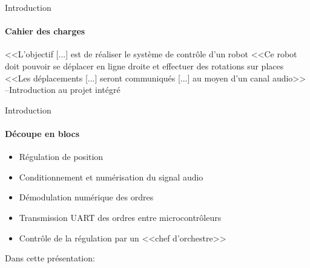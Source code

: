 \begin{frame}{Introduction}
\framesubtitle{Cahier des charges}
\large
<<L'objectif [...] est de réaliser le système de contrôle d'un robot
\vfill
<<Ce robot doit pouvoir se déplacer en ligne droite et effectuer des rotations sur places
\vfill
<<Les déplacements [...] seront communiqués [...] au moyen d'un canal audio>>
\vfill
\hspace{5em}--Introduction au projet intégré
\end{frame}


\begin{frame}{Introduction}
  \framesubtitle{Découpe en blocs}
  \begin{itemize}
    \item Régulation de position
    \item Conditionnement et numérisation du signal audio
    \item Démodulation numérique des ordres
    \item Transmission UART des ordres entre microcontrôleurs
    \item Contrôle de la régulation par un <<chef d'orchestre>>
  \end{itemize}
\end{frame}

\begin{frame}{Dans cette présentation:}
  \tableofcontents
\end{frame}
